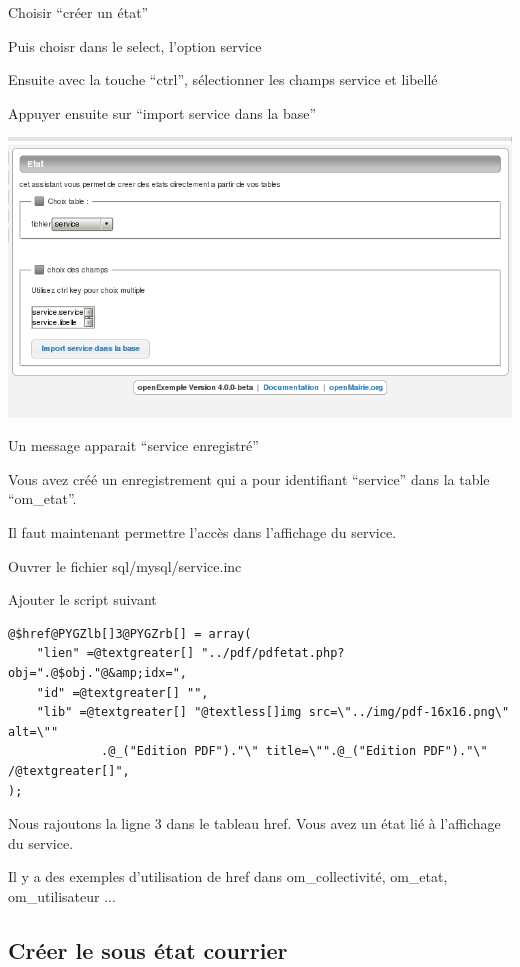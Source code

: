 \documentclass[letterpaper,10pt,french]{manual}
\begin{document}
Choisir ``créer un état''

Puis choisr dans le select, l'option service

Ensuite avec la touche ``ctrl'', sélectionner les champs service et libellé

Appuyer ensuite sur ``import service dans la base''

\includegraphics{utilisation_12.png}

Un message apparait ``service enregistré''

Vous avez créé un enregistrement qui a pour identifiant ``service'' dans
la table ``om\_etat''.

Il faut maintenant permettre l'accès dans l'affichage du service.

Ouvrer le fichier sql/mysql/service.inc

Ajouter le script suivant

\begin{Verbatim}[commandchars=@\[\]]
@$href@PYGZlb[]3@PYGZrb[] = array(
    "lien" =@textgreater[] "../pdf/pdfetat.php?obj=".@$obj."@&amp;idx=",
    "id" =@textgreater[] "",
    "lib" =@textgreater[] "@textless[]img src=\"../img/pdf-16x16.png\" alt=\""
             .@_("Edition PDF")."\" title=\"".@_("Edition PDF")."\" /@textgreater[]",
);
\end{Verbatim}

Nous rajoutons la ligne 3 dans le tableau href. Vous avez un état lié
à l'affichage du service.

Il y a des exemples d'utilisation de href dans om\_collectivité, om\_etat,
om\_utilisateur ...


\subsection{Créer le sous état courrier}
\end{document}
